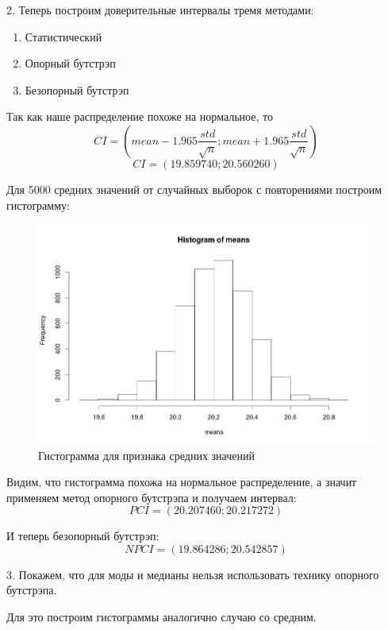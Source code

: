\documentclass{article}
\begin{document}
2. Теперь построим доверительные интервалы тремя методами:
\begin{enumerate}
    \item Статистический
    \item Опорный бутстрэп
    \item Безопорный бутстрэп
\end{enumerate}

Так как наше распределение похоже на нормальное, то
$$CI = \left(mean - 1.965 \frac{std}{\sqrt{n}}; mean + 1.965 \frac{std}{\sqrt{n}}\right)$$
$$CI = (19.859740; 20.560260)$$

Для 5000 средних значений от случайных выборок с повторениями построим гистограмму:

\begin{figure}[H] 
\centering
\includegraphics[scale=0.4]{img/2_pivotal.png}
\caption{Гистограмма для признака средних значений}
\label{fig :metka1}
\end{figure}

Видим, что гистограмма похожа на нормальное распределение, а значит применяем метод опорного бутстрэпа и получаем интервал:
$$PCI = (20.207460; 20.217272)$$

И теперь безопорный бутстрэп:
$$NPCI = (19.864286; 20.542857)$$

3. Покажем, что для моды и медианы нельзя использовать технику опорного бутстрэпа.

Для это построим гистограммы аналогично случаю со средним.
\end{document}
